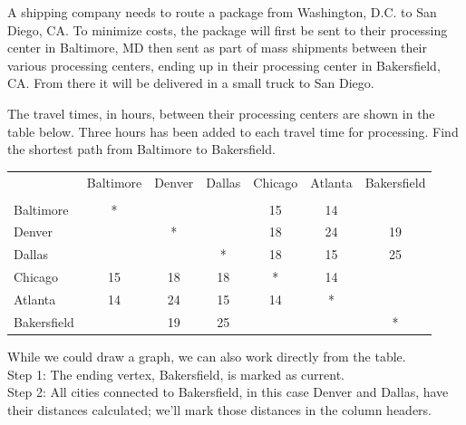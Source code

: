\begin{example}{}
A shipping company needs to route a package from Washington, D.C. to San Diego, CA.  To minimize costs, the package will first be sent to their processing center in Baltimore, MD then sent as part of mass shipments between their various processing centers, ending up in their processing center in Bakersfield, CA.  From there it will be delivered in a small truck to San Diego.  

The travel times, in hours, between their processing centers are shown in the table below.  Three hours has been added to each travel time for processing.  Find the shortest path from Baltimore to Bakersfield.
 \begin{center}
 \begin{tabular}{|l|c|c|c|c|c|c|}
 \hline
 & Baltimore & Denver & Dallas & Chicago & Atlanta & Bakersfield\\
 &&&&&&\\
 \hline
 Baltimore & * &&&15&14&\\
 \hline
 Denver &&*&&18&24&19\\
 \hline
Dallas&&&*&18&15&25\\
 \hline
 Chicago &15&18&18&*&14&\\
 \hline
 Atlanta & 14 & 24&15&14&*&\\
 \hline
 Bakersfield &&19&25&&&*\\
 \hline
 \end{tabular}
\par{}\label{tab:graphtheory-dor1-tab01}%

 \end{center}

While we could draw a graph, we can also work directly from the table. \\

\noindent Step 1:  The ending vertex, Bakersfield, is marked as current.\\

\noindent Step 2:  All cities connected to Bakersfield, in this case Denver and Dallas, have their distances calculated; we'll mark those distances in the column headers.  \\


\end{example}
